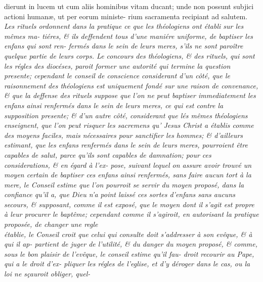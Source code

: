 \documentclass{article}
\begin{document}
\newpage
\bgroup\fontsize{10}{13}\selectfont\noindent
dierunt in lucem ut cum aliis hominibus\break
vitam ducant; unde non possunt subjici\break
actioni humanæ, ut per eorum ministe-\break
rium sacramenta recipiant ad salutem.\break
\fontsize{9}{13}\selectfont\itshape Les rituels ordonnent dans la
pratique ce que\break
les théologiens ont établi sur les mêmes ma-\break
tiéres, \& ils deffendent tous d’une maniére\break
uniforme, de baptiser les enfans qui sont ren-\break
fermés dans le sein de leurs meres, s’ils ne\break
sont paroître quelque partie de leurs corps.\break 
Le concours des théologiens, \& des rituels, qui sont les régles des diocéses, paroit former une
autorité qui termine la question presente; cependant le conseil de conscience
considerant d’un côté, que le raisonnement des théologiens est uniquement fondé sur
une raison de convenance, \& que la deffense des rituels suppose que l’on ne peut
baptiser immediatement les enfans ainsi renfermés dans le sein de leurs meres, ce
qui est contre la supposition presente; \& d’un autre côté, considerant que lés
mêmes\break
\egroup
\bgroup\fontsize{9}{13}\selectfont\itshape\noindent
théologiens enseignent, que l’on peut risquer\break
les sacremens qu’ {\upshape Jesus Christ} a établis comme\break
des moyens faciles, mais nécessaires pour\break 
sanctifier les hommes; \& d’ailleurs estimant,\break
que les enfans renfermés dans le sein de leurs\break
meres, pourroient être capables de salut,\break
parce qu’ils sont capables de damnation;\tsk\break  
pour ces considerations, \& en égard à l’ex-\break
pose, suivant lequel on assure avoir trouvé\break
un moyen certain de baptiser ces enfans ainsi\break
renfermés, sans faire aucun tort à la mere,\break
le Conseil estime que l’on pourroit se servir du\break
moyen proposé, dans la confiance qu’il a, que\break
Dieu n’a point laissé ces sortes d’enfans\break
sans aucuns secours, \& supposant, comme\break
il est exposé, que le moyen dont il s’agit est\break
propre à leur procurer le baptême; cependant\break
comme il s’agiroit, en autorisant la pratique\break
proposée, de changer une regle \\
établie, le Conseil croit que celui qui consulte\break
doit s’addresser à son evêque, \& à qui il ap-\break
partient de juger de l’utilité, \& du danger\break
du moyen proposé, \& comme, sous le bon\break
plaisir de l’evêque, le conseil estime qu’il fau-\break
droit recourir au Pape, qui a le droit d’ex-\break
pliquer les régles de l’eglise, et d’y déroger\break
dans le cas, ou la loi ne sçauroit obliger, quel-\break
\end{document}
